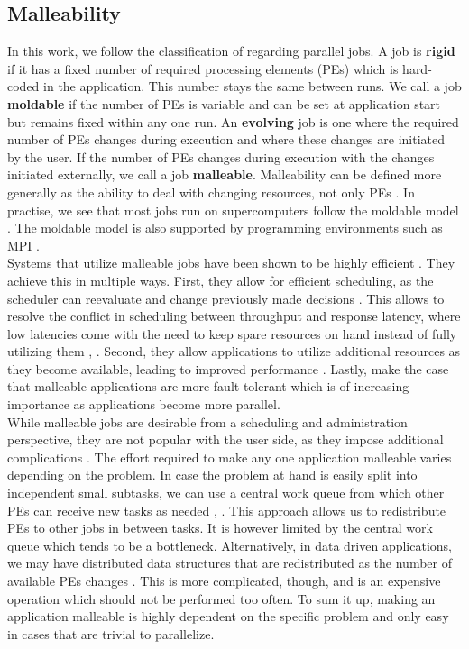 \subsection{Malleability}
\label{prelim: malleability}
In this work, we follow the classification of \cite{feitelson1997job} regarding parallel jobs. A job is \textbf{rigid} if it has a fixed number of required processing elements (PEs) which is hard-coded in the application. This number stays the same between runs. We call a job \textbf{moldable} if the number of PEs is variable and can be set at application start but remains fixed within any one run. An \textbf{evolving} job is one where the required number of PEs changes during execution and where these changes are initiated by the user. If the number of PEs changes during execution with the changes initiated externally, we call a job \textbf{malleable}.
Malleability can be defined more generally as the ability to deal with changing resources, not only PEs \cite{sonmez2007scheduling}. In practise, we see that most jobs run on supercomputers follow the moldable model \cite{cirne2001model}. The moldable model is also supported by programming environments such as MPI \cite{hungershofer2004combined}. \\
Systems that utilize malleable jobs have been shown to be highly efficient \cite{feitelson1997job}.
They achieve this in multiple ways.
First, they allow for efficient scheduling, as the scheduler can reevaluate and change previously made decisions \cite{sonmez2007scheduling}. This allows to resolve the conflict in scheduling between throughput and response latency, where low latencies come with the need to keep spare resources on hand instead of fully utilizing them \cite{feitelson1997job}, \cite{hungershofer2004combined}.
Second, they allow applications to utilize additional resources as they become available, leading to improved performance \cite{hungershofer2004combined}. Lastly, \cite{buisson2005framework} make the case that malleable applications are more fault-tolerant which is of increasing importance as applications become more parallel. \\
While malleable jobs are desirable from a scheduling and administration perspective, they are not popular with the user side, as they impose additional complications \cite{feitelson1997job}. The effort required to make any one application malleable varies depending on the problem. In case the problem at hand is easily split into independent small subtasks, we can use a central work queue from which other PEs can receive new tasks as needed \cite{feitelson1997job}, \cite{tucker1989process}. This approach allows us to redistribute PEs to other jobs in between tasks. It is however limited by the central work queue which tends to be a bottleneck. Alternatively, in data driven applications, we may have distributed data structures that are redistributed as the number of available PEs changes \cite{feitelson1997job}. This is more complicated, though, and is an expensive operation which should not be performed too often. To sum it up, making an application malleable is highly dependent on the specific problem and only easy in cases that are trivial to parallelize.

